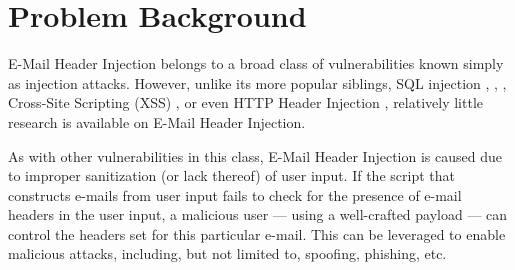 \section{Problem Background}

E-Mail Header Injection belongs to a broad class of vulnerabilities known simply as injection attacks. However, unlike its more popular siblings, SQL injection \cite{sql1}, \cite{sql0}, \cite{sql2}, Cross-Site Scripting (XSS) \cite{Injection1}, \cite{KleinAmit} or even HTTP Header Injection \cite{sessionride}, relatively little research is available on E-Mail Header Injection.

As with other vulnerabilities in this class, E-Mail Header Injection is caused due to improper sanitization (or lack thereof) of user input. If the script that constructs e-mails from user input fails to check for the presence of e-mail headers in the user input, a malicious user --- using a well-crafted payload --- can control the headers set for this particular e-mail. This can be leveraged to enable malicious attacks, including, but not limited to, spoofing, phishing, etc.